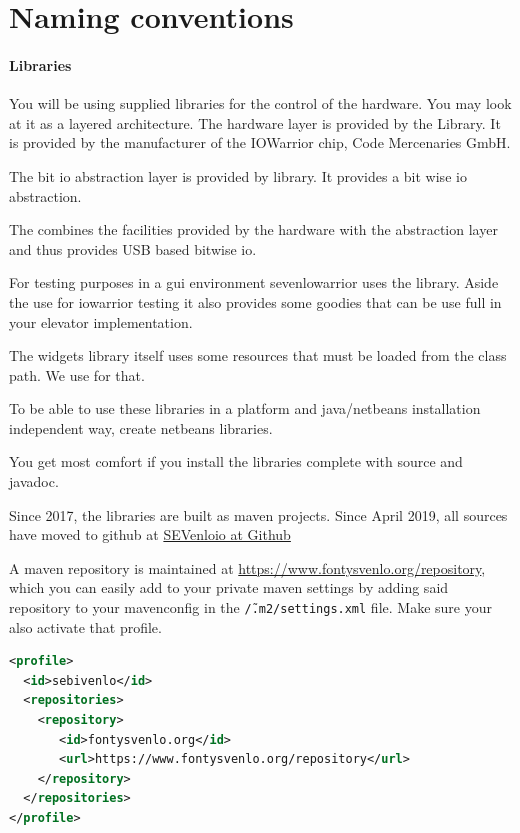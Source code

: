 \section{Naming conventions}
\paragraph{Libraries}
You will be using supplied libraries for the control of the
hardware. You may look at it as a layered architecture. The hardware
layer is provided by the  Library. It is provided by
the manufacturer of the IOWarrior chip, Code Mercenaries GmbH.

The bit io abstraction layer is provided by 
library. It provides a bit wise io abstraction.

The  combines the facilities provided by the
hardware with the abstraction layer and thus provides USB based
bitwise io. 

For testing purposes in a gui environment sevenlowarrior uses the
 library. Aside the use for iowarrior testing it
also provides some goodies that can be use full in your elevator
implementation.

The widgets library itself uses some resources that must be loaded
from the class path. We use  for that.

To be able to use these libraries in a platform and java/netbeans installation
independent way, create netbeans libraries.


You get most comfort if you install the libraries complete with source
and javadoc. 

Since 2017, the libraries are built as maven projects. Since April 2019, all sources have moved
to github at \href{https://github.com/sebivenlo/sevenloio}{SEVenloio at Github}

A maven repository is maintained at \url{https://www.fontysvenlo.org/repository}, which
you can easily add to your private maven settings by adding said repository to your mavenconfig in the \texttt{\~/.m2/settings.xml} file.
Make sure your also activate that profile.

\begin{lstlisting}[language=xml,caption={settings}]
<profile>
  <id>sebivenlo</id>
  <repositories>
    <repository>
       <id>fontysvenlo.org</id>
       <url>https://www.fontysvenlo.org/repository</url>
    </repository>
  </repositories>
</profile>
\end{lstlisting}


